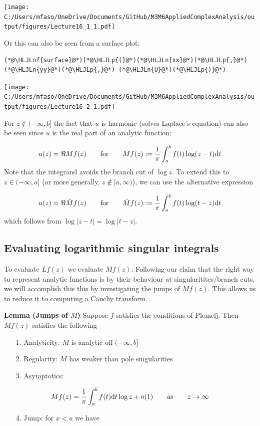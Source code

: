 \documentclass[12pt,landscape]{article}
\newcommand{\HLJLn}[1]{#1}
\newcommand{\HLJLnf}[1]{\textcolor[RGB]{66,102,213}{#1}}
\newcommand{\HLJLp}[1]{#1}
\def\qqfor{\qquad\hbox{for}\qquad}
\def\qqas{\qquad\hbox{as}\qquad}
\def\D{ {\rm d} }
\def\dt{\D t}
\def\cent#1{\begin{center}#1\end{center} }
\begin{document}
{\cent{\texttt{[image: C:/Users/mfaso/OneDrive/Documents/GitHub/M3M6AppliedComplexAnalysis/output/figures/Lecture16\_1\_1.pdf]}}

Or this can also be seen from a surface plot:


\begin{lstlisting}
(*@\HLJLnf{surface}@*)(*@\HLJLp{(}@*)(*@\HLJLn{xx}@*)(*@\HLJLp{,}@*) (*@\HLJLn{yy}@*)(*@\HLJLp{,}@*) (*@\HLJLn{U}@*)(*@\HLJLp{)}@*)
\end{lstlisting}

\texttt{[image: C:/Users/mfaso/OneDrive/Documents/GitHub/M3M6AppliedComplexAnalysis/output/figures/Lecture16\_2\_1.pdf]}

For $z \notin (-\infty,b]$ the fact that $u$ is harmonic (solves Laplace's equation) can also be seen since $u$ is the real part of an analytic function:

\[
    u(z) = \Re Mf(z) \qqfor  Mf(z) := {1 \over \pi} \int_a^b f(t) \log ( z - t) \dt
\]
Note that the integrand avoids the branch cut of $\log z$. To extend this to $z\in (-\infty,a]$ (or more generally, $z \notin [a,\infty)$), we can use the alternative expression

\[
    u(z) = \Re \tilde Mf(z) \qqfor  \tilde Mf(z) := {1 \over \pi} \int_a^b f(t) \log ( t-z) \dt
\]
which follows from $\log|z-t| = \log|t-z|$.
\newpage
\subsection{Evaluating logarithmic singular integrals}
To evaluate $L f(z)$ we evaluate $M f(z)$. Following our claim that the right way to represent analytic functions is by their behaviour at singularitites/branch cuts, we will accomplish this this by investigating the jumps of $M f(z)$. This allows us to reduce it to computing a Cauchy transform.

\textbf{Lemma (Jumps of $M$)} Suppose $f$ satisfies the conditions of Plemelj. Then $M f(z)$ satisfies the following

\begin{itemize}
\item[1. ] Analyticity: $M$ is analytic off $(-\infty,b]$


\item[2. ] Regularity: $M$ has weaker than pole singularities


\item[3. ] Asymptotics:

\end{itemize}
\[
Mf(z) = {1 \over \pi} \int_a^b f(t) \D t \log z + o(1) \qqas z \rightarrow \infty
\]
\begin{itemize}
\item[4. ] Jump: for $x < a$ we have


\end{itemize}}
\end{document}
